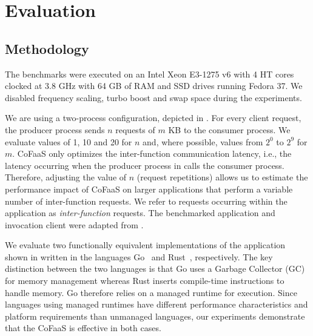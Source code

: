 \section{Evaluation}
\label{sec:evaluation}

\subsection{Methodology}
\label{sec:methodology}


The benchmarks were executed on an Intel Xeon E3-1275 v6 with 4 HT cores clocked at 3.8 GHz with 64 GB of RAM and SSD drives running Fedora 37. We disabled frequency scaling, turbo boost and swap space during the experiments.

We are using a two-process configuration, depicted in . For every client request, 
the producer process sends $n$ requests of $m$ KB to the consumer process. We evaluate values of 1, 10 and 20 for $n$ and, where possible, values from $2^{0}$ to $2^{9}$ for $m$. CoFaaS only optimizes the inter-function communication latency, i.e., the latency occurring when the producer process in  calls the consumer process.
Therefore, adjusting the value of $n$ (request repetitions) allows us to estimate the performance impact of CoFaaS on larger applications that perform a variable number of inter-function requests. We refer to requests occurring within the application as \emph{inter-function} requests. The benchmarked  application and invocation client were adapted from \cite{ustiugov:benchmarking}.

We evaluate two functionally equivalent implementations of the application shown in  written in the languages Go~\cite{golang} and Rust~\cite{rust}, respectively. The key distinction between the two languages is that Go uses a Garbage Collector (GC) for memory management whereas Rust inserts compile-time instructions to handle memory. Go therefore relies on a managed runtime for execution. Since languages using managed runtimes have different performance characteristics and platform requirements than unmanaged languages, our experiments demonstrate that the CoFaaS is %
effective in both cases.

